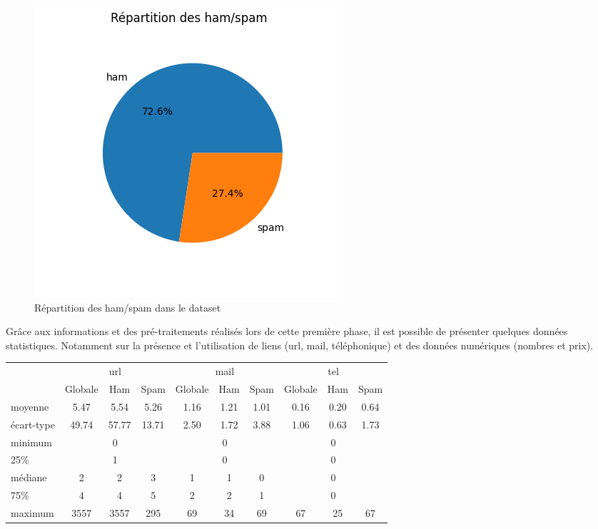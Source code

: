 \documentclass[a4paper,12pt]{article}
\begin{document}
			\begin{figure}[H]
				\centering
				\includegraphics[scale=1]{img/hamSpam.png}
				\caption{Répartition des ham/spam dans le dataset}
			\end{figure}
			
			Grâce aux informations et des pré-traitements réalisés lors de cette première phase, il est possible de présenter quelques données statistiques. Notamment sur la présence et l'utilisation de liens (url, mail, téléphonique) et des données numériques (nombres et prix).\\

			\begin{table}[H]
					\centering
					 \label{tab:p1liens}
					\begin{tabular}{|l|c|c|c|c|c|c|c|c|c|}
						\hline
						 	& \multicolumn{3}{|c|}{url} & \multicolumn{3}{|c|}{mail} & \multicolumn{3}{|c|}{tel}\\
						 	& Globale & Ham & Spam & Globale & Ham & Spam & Globale & Ham & Spam \\
						\hline
						moyenne    & 5.47 & 5.54 & 5.26 & 1.16 & 1.21 & 1.01 & 0.16 & 0.20 & 0.64 \\
						\hline
						écart-type & 49.74 & 57.77 & 13.71    & 2.50 & 1.72 & 3.88     & 1.06 & 0.63 & 1.73 \\
						\hline
						minimum    & \multicolumn{3}{|c|}{0} & \multicolumn{3}{|c|}{0} & \multicolumn{3}{|c|}{0} \\
						\hline
						25\%       & \multicolumn{3}{|c|}{1}     & \multicolumn{3}{|c|}{0}    & \multicolumn{3}{|c|}{0} \\
						\hline
						médiane    & 2 & 2 & 3     & 1 & 1 & 0   & \multicolumn{3}{|c|}{0} \\
						\hline
						75\%       & 4 & 4 & 5    & 2 & 2 & 1    & \multicolumn{3}{|c|}{0} \\
						\hline
						maximum    & 3557 & 3557 & 295  & 69 & 34 & 69  & 67 & 25 & 67 \\
						\hline
					\end{tabular}
				\end{table}
				
\end{document}
